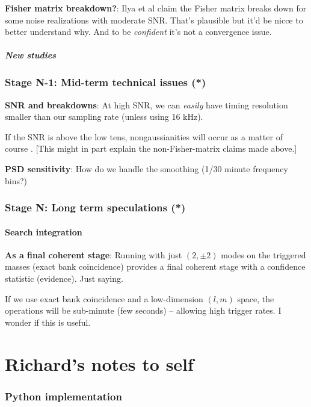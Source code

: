 \documentclass[twocolumn,prd,nofootinbib]{revtex4}
\newcommand\editremark[1]{{\color{red} #1}}
\begin{document}
\noindent \textbf{Fisher matrix breakdown?}: Ilya et al claim the Fisher matrix breaks down for some noise realizations
with moderate SNR.  That's plausible but it'd be nicce to better understand why.  And to be \emph{confident} it's not a
convergence issue.

\subsubsection{New studies}


\section{Stage N-1: Mid-term technical issues (*)}

\noindent \textbf{SNR and breakdowns}: At high SNR, we can \emph{easily} have timing resolution smaller than our
sampling rate (unless using 16 kHz). 

If the SNR is above the low tens, nongaussianities will occur as a matter of course .  [This might in part explain the
  non-Fisher-matrix claims made above.]

\noindent \textbf{PSD sensitivity}: How do we handle the smoothing (1/30 minute  frequency bins?)



\section{Stage N: Long term speculations (*)}


\subsection{Search integration}

\noindent \textbf{As a final coherent stage}: Running with just $(2,\pm 2)$ modes on the triggered masses (exact bank
coincidence) provides a final coherent stage with a confidence statistic (evidence).  Just saying.

If we use exact bank coincidence and a low-dimension $(l,m)$ space, the operations will be sub-minute (few seconds) --
allowing high trigger rates. \editremark{I wonder if this is useful}.



\part{Richard's notes to self}

\section{Python implementation}
\end{document}
